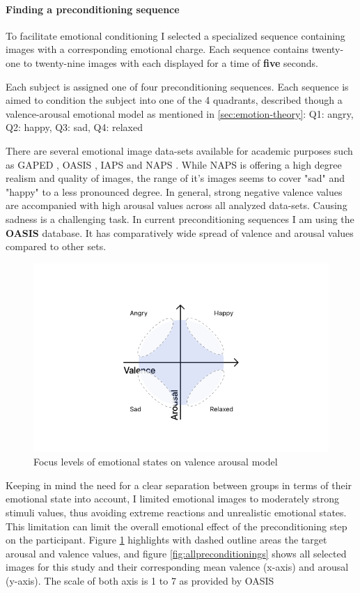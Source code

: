 \paragraph{Finding a preconditioning sequence}
To facilitate emotional conditioning I selected a specialized sequence containing images with a corresponding emotional charge.
Each sequence contains twenty-one to twenty-nine images with each displayed for a time of \textbf{five} seconds.

Each subject is assigned one of four preconditioning sequences. Each sequence is aimed to condition the subject into one of the 4 quadrants, described though a valence-arousal emotional model as mentioned in \ref{sec:emotion-theory}: Q1: angry, Q2: happy, Q3: sad, Q4: relaxed

There are several emotional image data-sets available for academic purposes such as GAPED \cite{Dan-Glauser2011}, OASIS \cite{Kurdi2017}, IAPS \cite{Lang1997} and NAPS \cite{Marchewka2014}. While NAPS is offering a high degree realism and quality of images, the range of it's images seems to cover "sad" and "happy" to a less pronounced degree. In general, strong negative valence values are accompanied with high arousal values across all analyzed data-sets. Causing sadness is a challenging task. In current preconditioning sequences I am using the \textbf{OASIS} database. It has comparatively wide spread of valence and arousal values compared to other sets.

\begin{figure}
	\centering
	\includegraphics[width=0.7\linewidth]{graphics/Valence-Arousal-Model-1.png}
	\caption{Focus levels of emotional states on valence arousal model}
	\label{fig:valence-arousal-model-2}
\end{figure}

Keeping in mind the need for a clear separation between groups in terms of their emotional state into account, I limited emotional images to moderately strong stimuli values, thus avoiding extreme reactions and unrealistic emotional states. This limitation can limit the overall emotional effect of the preconditioning step on the participant. Figure \ref{fig:valence-arousal-model-2} highlights with dashed outline areas the target arousal and valence values, and figure \ref{fig:allpreconditionings} shows all selected images for this study and their corresponding mean valence (x-axis) and arousal (y-axis). The scale of both axis is 1 to 7 as provided by OASIS \cite{Kurdi2017}

